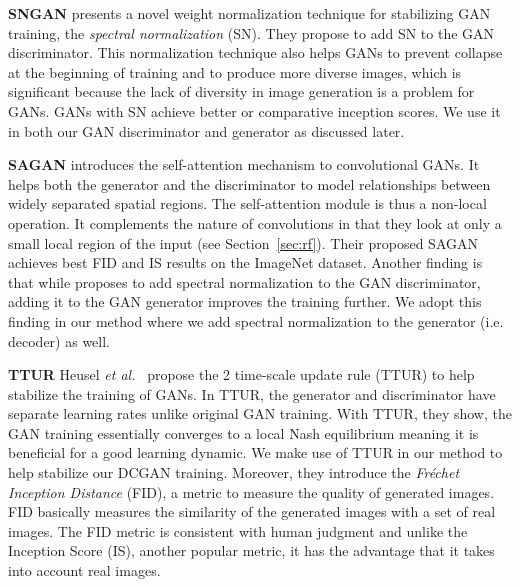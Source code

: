 \documentclass[12pt,a4paper]{article}
\begin{document}
\par \textbf{SNGAN} \cite{SNGAN} presents a novel weight normalization technique for stabilizing GAN training, the \textit{spectral normalization} (SN). They propose to add SN to the GAN discriminator. This normalization technique also helps GANs to prevent collapse at the beginning of training and to produce more diverse images, which is significant because the lack of diversity in image generation is a problem for GANs. GANs with SN achieve better or comparative inception scores. We use it in both our GAN discriminator and generator as discussed later.

\par \textbf{SAGAN} \cite{SAGAN} introduces the self-attention mechanism to convolutional GANs. It helps both the generator and the discriminator to model relationships between widely separated spatial regions. The self-attention module is thus a non-local operation. It complements the nature of convolutions in that they look at only a small local region of the input (see Section~\ref{sec:rf}). Their proposed SAGAN achieves best FID and IS results on the ImageNet dataset. Another finding is that while \cite{SNGAN} proposes to add spectral normalization to the GAN discriminator, adding it to the GAN generator improves the training further. We adopt this finding in our method where we add spectral normalization to the generator (i.e. decoder) as well. 

\par \textbf{TTUR} Heusel \textit{et al.}~\cite{TTUR} propose the 2 time-scale
update rule (TTUR) to help stabilize the training of GANs. In TTUR, the generator and discriminator have separate learning rates unlike original GAN training. With TTUR, they show, the GAN training essentially converges to a local Nash equilibrium meaning it is beneficial for a good learning dynamic. We make use of TTUR in our method to help stabilize our DCGAN training. Moreover, they introduce the \textit{Fréchet Inception Distance} (FID), a metric to measure the quality of generated images. FID basically measures the similarity of the generated images with a set of real images. The FID metric is consistent with human judgment and unlike the Inception Score (IS), another popular metric, it has the advantage that it takes into account real images.
\end{document}
